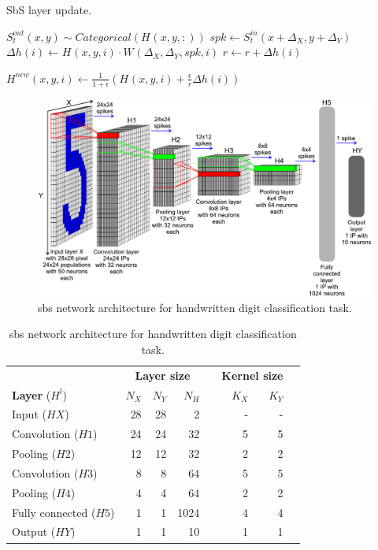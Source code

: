 \begin{algorithm}[b!]
	\caption{SbS layer update.}\label{alg:sbs}
	
	\begin{algorithmic}[1]
		\STATE $S^{out}_t(x, y) \sim Categorical( H^{}(x, y, :) ) $
		\STATE $spk \leftarrow S^{in}_t(x + \Delta_X , y + \Delta_Y)$
		\STATE $\Delta h(i)
		\leftarrow H^{}(x, y,  i) \cdot W^{}(\Delta_X, \Delta_Y, spk, i)$
		\STATE $r \leftarrow r + \Delta h(i)$
		\ENDFOR
		
		\STATE $H^{new}(x, y, i) \leftarrow \frac{1}{1+\epsilon} \left( H^{}(x, y, i) + \frac{\epsilon}{r} \Delta h(i) \right) $              
		\ENDFOR
		\ENDFOR
		\ENDFOR
		\ENDFOR
	\end{algorithmic} 
\end{algorithm}

\begin{figure}[b!]
	\centering
	\includegraphics[width=0.5\columnwidth]{./chapters/sbs_accelerator/figures/sbs_network.pdf}
	\caption{\gls{sbs} network architecture for handwritten digit classification task.}
	\label{fig:sbs_network}
\end{figure}


\begin{table}[t!]\centering
	\caption{\gls{sbs} network architecture for handwritten digit classification task.}
	\label{tab:sbs_network}
	\scriptsize
	\begin{tabular}{lrrrrrrr}\toprule
		&\multicolumn{3}{c}{\textbf{Layer size}} & &\multicolumn{2}{c}{\textbf{Kernel size}} \\\cmidrule{2-4}\cmidrule{6-7}
		\textbf{Layer} ($H^l$) &$N_X$ &$N_Y$ &$N_H$ & &$K_X$ &$K_Y$ \\\midrule
		Input ($HX$) &28 &28 &2 & &- &- \\
		Convolution ($H1$) &24 &24 &32 & &5 &5 \\
		Pooling ($H2$) &12 &12 &32 & &2 &2 \\
		Convolution ($H3$) &8 &8 &64 & &5 &5 \\
		Pooling ($H4$) &4 &4 &64 & &2 &2 \\
		Fully connected ($H5$) &1 &1 &1024 & &4 &4 \\
		Output ($HY$) &1 &1 &10 & &1 &1 \\
		\bottomrule
	\end{tabular}
\end{table}

